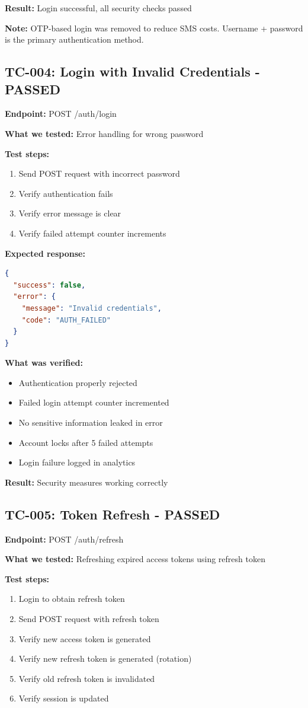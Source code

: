 \documentclass[11pt,a4paper]{article}
\begin{document}
\textbf{Result:} Login successful, all security checks passed

\textbf{Note:} OTP-based login was removed to reduce SMS costs. Username + password is the primary authentication method.

\subsection{TC-004: Login with Invalid Credentials - PASSED}
\textbf{Endpoint:} POST /auth/login

\textbf{What we tested:} Error handling for wrong password

\textbf{Test steps:}
\begin{enumerate}
    \item Send POST request with incorrect password
    \item Verify authentication fails
    \item Verify error message is clear
    \item Verify failed attempt counter increments
\end{enumerate}

\textbf{Expected response:}
\begin{lstlisting}[language=json]
{
  "success": false,
  "error": {
    "message": "Invalid credentials",
    "code": "AUTH_FAILED"
  }
}
\end{lstlisting}

\textbf{What was verified:}
\begin{itemize}
    \item Authentication properly rejected
    \item Failed login attempt counter incremented
    \item No sensitive information leaked in error
    \item Account locks after 5 failed attempts
    \item Login failure logged in analytics
\end{itemize}

\textbf{Result:} Security measures working correctly

\subsection{TC-005: Token Refresh - PASSED}
\textbf{Endpoint:} POST /auth/refresh

\textbf{What we tested:} Refreshing expired access tokens using refresh token

\textbf{Test steps:}
\begin{enumerate}
    \item Login to obtain refresh token
    \item Send POST request with refresh token
    \item Verify new access token is generated
    \item Verify new refresh token is generated (rotation)
    \item Verify old refresh token is invalidated
    \item Verify session is updated
\end{enumerate}
\end{document}
